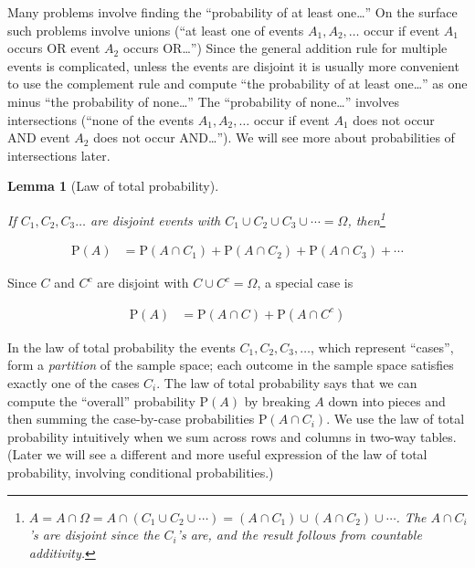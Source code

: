 \documentclass[
  letterpaper,
  DIV=11,
  numbers=noendperiod]{scrreprt}
\theoremstyle{plain}
\newtheorem{lemma}{Lemma}[chapter]
\theoremstyle{definition}
\theoremstyle{definition}
\theoremstyle{definition}
\theoremstyle{remark}
\begin{document}
Many problems involve finding the ``probability of at least
one\ldots{}'' On the surface such problems involve unions (``at least
one of events \(A_1, A_2, \ldots\) occur if event \(A_1\) occurs OR
event \(A_2\) occurs OR\ldots{}'') Since the general addition rule for
multiple events is complicated, unless the events are disjoint it is
usually more convenient to use the complement rule and compute ``the
probability of at least one\ldots{}'' as one minus ``the probability of
none\ldots{}'' The ``probability of none\ldots{}'' involves
intersections (``none of the events \(A_1, A_2, \ldots\) occur if event
\(A_1\) does not occur AND event \(A_2\) does not occur AND\ldots{}'').
We will see more about probabilities of intersections later.

\begin{lemma}[Law of total
probability]\protect\hypertarget{lem-ltp1}{}\label{lem-ltp1}

 If \(C_1, C_2, C_3\ldots\) are disjoint
events with \(C_1\cup C_2 \cup C_3\cup \cdots =\Omega\), then\footnote{\(A = A\cap \Omega = A\cap(C_1 \cup C_2 \cup \cdots) = (A\cap C_1)\cup(A\cap C_2)\cup \cdots\).
  The \(A\cap C_i\)'s are disjoint since the \(C_i\)'s are, and the
  result follows from countable additivity.}

\end{lemma}

\begin{align*}
    \textrm{P}(A) & = \textrm{P}(A \cap C_1) + \textrm{P}(A \cap C_2) + \textrm{P}(A \cap C_3) + \cdots
\end{align*}

Since \(C\) and \(C^c\) are disjoint with \(C \cup C^c = \Omega\), a
special case is

\begin{align*}
    \textrm{P}(A) & = \textrm{P}(A \cap C) + \textrm{P}(A \cap C^c)
\end{align*}

In the law of total probability the events \(C_1, C_2, C_3, \ldots\),
which represent ``cases'', form a \emph{partition} of the sample space;
each outcome in the sample space satisfies exactly one of the cases
\(C_i\). The law of total probability says that we can compute the
``overall'' probability \(\textrm{P}(A)\) by breaking \(A\) down into
pieces and then summing the case-by-case probabilities
\(\textrm{P}(A\cap C_i)\). We use the law of total probability
intuitively when we sum across rows and columns in two-way tables.
(Later we will see a different and more useful expression of the law of
total probability, involving conditional probabilities.)
\end{document}
